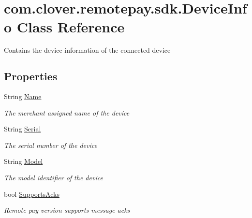 \hypertarget{classcom_1_1clover_1_1remotepay_1_1sdk_1_1_device_info}{}\section{com.\+clover.\+remotepay.\+sdk.\+Device\+Info Class Reference}
\label{classcom_1_1clover_1_1remotepay_1_1sdk_1_1_device_info}


Contains the device information of the connected device  


\subsection*{Properties}
\begin{DoxyCompactItemize}
\item 
String \hyperlink{classcom_1_1clover_1_1remotepay_1_1sdk_1_1_device_info_a9c86b538fe3533ea3c32a8e343483e64}{Name}
\begin{DoxyCompactList}\small\item\em The merchant assigned name of the device \end{DoxyCompactList}\item 
String \hyperlink{classcom_1_1clover_1_1remotepay_1_1sdk_1_1_device_info_a71e61e0e91dbad7ca3d0f235db6f30f4}{Serial}
\begin{DoxyCompactList}\small\item\em The serial number of the device \end{DoxyCompactList}\item 
String \hyperlink{classcom_1_1clover_1_1remotepay_1_1sdk_1_1_device_info_a81b57500c1c1969b85ddb1510b007c34}{Model}
\begin{DoxyCompactList}\small\item\em The model identifier of the device \end{DoxyCompactList}\item 
bool \hyperlink{classcom_1_1clover_1_1remotepay_1_1sdk_1_1_device_info_a508f3952d0ea526c63939e66ca36ea9b}{Supports\+Acks}
\begin{DoxyCompactList}\small\item\em Remote pay version supports message acks \end{DoxyCompactList}\end{DoxyCompactItemize}


